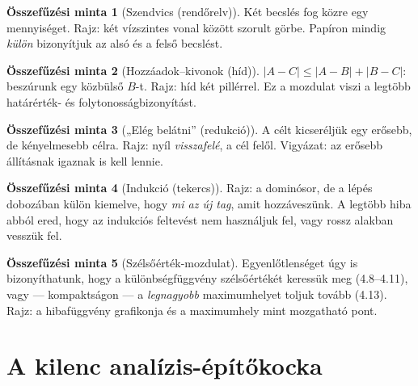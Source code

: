 \documentclass[11pt,a4paper]{article}
\theoremstyle{definition}
\newtheorem{minta}{Összefűzési minta}
\begin{document}
\begin{minta}[Szendvics (rendőrelv)]
Két becslés fog közre egy mennyiséget. Rajz: két vízszintes vonal között szorult görbe.
Papíron mindig \emph{külön} bizonyítjuk az alsó és a felső becslést.
\end{minta}

\begin{minta}[Hozzáadok--kivonok (híd)]
$|A - C| \le |A-B| + |B-C|$: beszúrunk egy közbülső $B$-t. Rajz: híd két pillérrel.
Ez a mozdulat viszi a legtöbb határérték- és folytonosságbizonyítást.
\end{minta}

\begin{center}
\end{center}

\begin{minta}[„Elég belátni” (redukció)]
A célt kicseréljük egy erősebb, de kényelmesebb célra. Rajz: nyíl \emph{visszafelé},
a cél felől. Vigyázat: az erősebb állításnak igaznak is kell lennie.
\end{minta}

\begin{minta}[Indukció (tekercs)]
Rajz: a dominósor, de a lépés dobozában külön kiemelve, hogy \emph{mi az új tag}, amit
hozzáveszünk. A legtöbb hiba abból ered, hogy az indukciós feltevést nem használjuk fel,
vagy rossz alakban vesszük fel.
\end{minta}

\begin{minta}[Szélsőérték-mozdulat]
Egyenlőtlenséget úgy is bizonyíthatunk, hogy a különbségfüggvény szélsőértékét keressük
meg (4.8--4.11), vagy --- kompaktságon --- a \emph{legnagyobb} maximumhelyet toljuk tovább
(4.13). Rajz: a hibafüggvény grafikonja és a maximumhely mint mozgatható pont.
\end{minta}


\section{A kilenc analízis-építőkocka}
\end{document}
